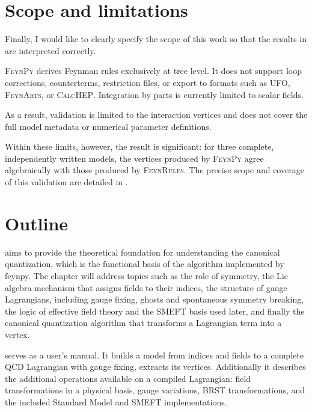 \section{Scope and limitations}
\label{sec:intro-scope}

Finally, I would like to clearly specify the scope of this work so that the results in  are interpreted correctly.

\textsc{FeynPy} derives Feynman rules exclusively at tree level. It does not support loop corrections, counterterms, restriction files, or export to formats such as UFO, \textsc{FeynArts}, or \textsc{CalcHEP}. Integration by parts is currently limited to scalar fields.

As a result, validation is limited to the interaction vertices and does not cover the full model metadata or numerical parameter definitions.

Within these limits, however, the result is significant: for three complete, independently written models, the vertices produced by \textsc{FeynPy} agree algebraically with those produced by \textsc{FeynRules}. The precise scope and coverage of this validation are detailed in .


\section{Outline}
\label{sec:intro-outline}

 aims to provide the theoretical foundation for understanding the canonical quantization, which is the functional basis of the algorithm implemented by feynpy. The chapter will address topics such as the role of symmetry, the Lie algebra mechanism that assigns fields to their indices, the structure of gauge Lagrangians, including gauge fixing, ghosts and spontaneous symmetry breaking, the logic of effective field theory and the SMEFT basis used later, and finally the canonical quantization algorithm that transforms a Lagrangian term into a vertex.

 serves as a user's manual. It builds a model from indices and fields to a complete QCD Lagrangian with gauge fixing, extracts its vertices. Additionally it describes the additional operations available on a compiled Lagrangian: field transformations
in a physical basis, gauge variations, BRST transformations,
and the included Standard Model and SMEFT implementations.

